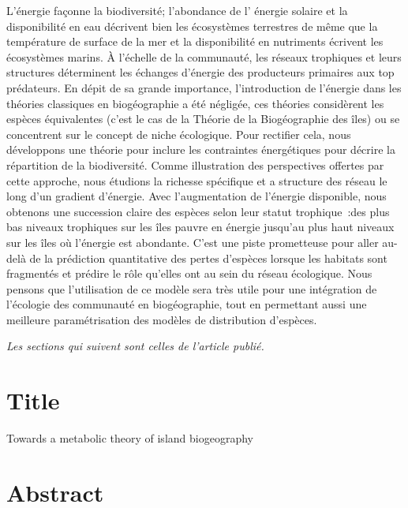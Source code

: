 L’énergie façonne la biodiversité; l’abondance de l’
énergie solaire et la disponibilité en eau décrivent bien les écosystèmes
terrestres de même que la température de surface de la mer et la disponibilité
en nutriments écrivent les écosystèmes marins. À l'échelle de la communauté,
les réseaux trophiques et leurs structures déterminent les échanges d'énergie
des producteurs primaires aux top prédateurs. En dépit de sa grande importance,
l'introduction de l'énergie dans les théories classiques en biogéographie a été
négligée, ces théories considèrent les espèces équivalentes (c'est le cas de la
Théorie de la Biogéographie des îles) ou se concentrent sur le concept de niche
écologique. Pour rectifier cela, nous développons une théorie pour inclure
les contraintes énergétiques pour décrire la répartition de la biodiversité.
Comme illustration des perspectives offertes par cette approche, nous étudions
la richesse spécifique et a structure des réseau le long d'un gradient
d'énergie. Avec l'augmentation de l'énergie disponible, nous obtenons une succession claire
des espèces selon leur statut trophique :des plus bas niveaux trophiques sur
les îles pauvre en énergie  jusqu'au plus haut niveaux sur les îles où l'énergie
est abondante. C'est une piste prometteuse pour aller au-delà de la prédiction quantitative
des pertes d’espèces lorsque les habitats sont fragmentés et prédire le rôle qu'elles
ont au sein du réseau écologique. Nous pensons que l'utilisation de ce modèle
sera très utile pour une intégration de l'écologie des communauté en biogéographie,
tout en permettant aussi une meilleure paramétrisation des modèles de distribution
d'espèces.




\emph{Les sections qui suivent sont celles de l'article publié.}
\section{Title}\label{title}

Towards a metabolic theory of island biogeography

\section{Abstract}\label{abstract}

